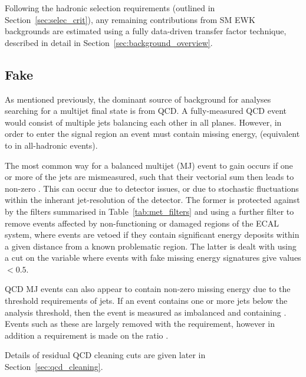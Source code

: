 
Following the hadronic selection requirements (outlined in
Section~\ref{sec:selec_crit}),
any remaining contributions from SM EWK backgrounds are estimated using a 
fully data-driven transfer factor technique, described in detail in
Section~\ref{sec:background_overview}.

\subsection{Fake \met}

As mentioned previously, the dominant source of background for analyses 
searching for a multijet final state is from QCD. A fully-measured QCD event 
would consist of multiple jets balancing each other in all planes. However, in 
order to enter the signal region an event must contain missing energy, 
\mht (equivalent to \met in all-hadronic events).

The most common way for a balanced multijet (MJ) event to gain \mht occurs if
one
or more of the jets are mismeasured, such that their vectorial sum then leads to non-zero
\mht. This can occur due to detector issues, or due to stochastic fluctuations
within
the inherant jet-resolution of the 
detector. The former is protected against by the \met filters summarised in 
Table~\ref{tab:met_filters} and using a further filter to remove events
affected by non-functioning or damaged regions of the ECAL system, where 
events are vetoed if they contain significant energy deposits within a given 
distance from a known problematic region. The latter is dealt with using a
cut on the \alphat variable where 
events with fake missing energy signatures give values $<0.5$.

QCD MJ events can also appear to contain non-zero missing energy 
due to the threshold requirements of jets. If an event contains 
one or more jets below the analysis threshold, then the 
event is measured as imbalanced and containing \mht. Events such as these are largely 
removed with the \alphat requirement, however in addition a requirement is made on the
ratio \mhtmet.

Details of residual QCD cleaning cuts are given later in
Section~\ref{sec:qcd_cleaning}.



